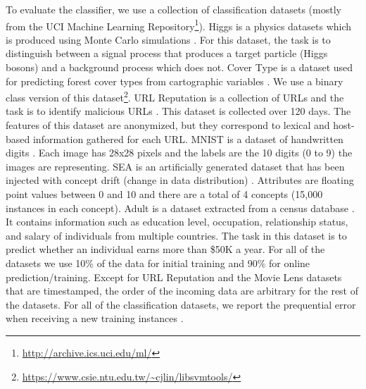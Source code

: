 \documentclass[10pt,conference,letterpaper]{IEEEtran}
\begin{document}
To evaluate the classifier, we use a collection of classification datasets (mostly from the UCI Machine Learning Repository\footnote{\url{http://archive.ics.uci.edu/ml/}}).
Higgs is a physics datasets which is produced using Monte Carlo simulations \cite{baldi2014searching}.
For this dataset, the task is to distinguish between a signal process that produces a target particle (Higgs bosons) and a background process which does not.
Cover Type is a dataset used for predicting forest cover types from cartographic variables \cite{collobert2002parallel}.
We use a binary class version of this dataset\footnote{\url{https://www.csie.ntu.edu.tw/~cjlin/libsvmtools/}}.
URL Reputation is a collection of URLs and the task is to identify malicious URLs \cite{ma2009identifying}. 
This dataset is collected over 120 days.
The features of this dataset are anonymized, but they correspond to lexical and host-based information gathered for each URL.
MNIST is a dataset of handwritten digits \cite{lecun-mnist}.
Each image has 28x28 pixels and the labels are the 10 digits (0 to 9) the images are representing.
SEA is an artificially generated dataset that has been injected with concept drift (change in data distribution) \cite{street2001streaming}.
Attributes are floating point values between 0 and 10 and there are a total of 4 concepts (15,000 instances in each concept).
Adult is a dataset extracted from a census database \cite{platt199912}.
It contains information such as education level, occupation, relationship status, and salary of individuals from multiple countries.
The task in this dataset is to predict whether an individual earns more than \$50K a year. 
For all of the datasets we use 10\% of the data for initial training and 90\% for online prediction/training.
Except for URL Reputation and the Movie Lens datasets that are timestamped, the order of the incoming data are arbitrary for the rest of the datasets.
For all of the classification datasets, we report the prequential error when receiving a new training instances \cite{gama2009issues} .
\end{document}
